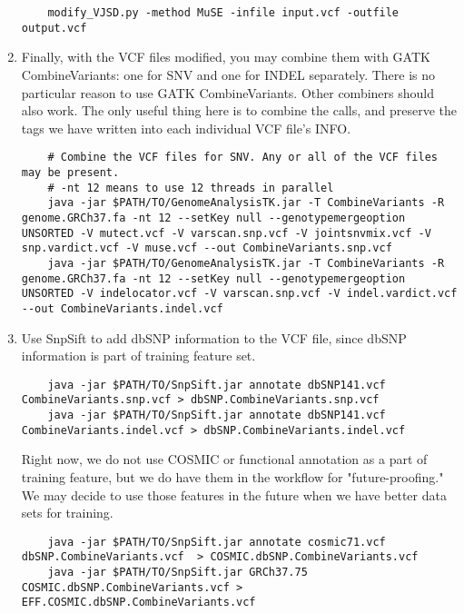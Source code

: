 \documentclass[10pt,letterpaper]{article}
\begin{document}
\begin{enumerate}
	\begin{lstlisting}
	modify_VJSD.py -method MuSE -infile input.vcf -outfile output.vcf
	\end{lstlisting}

	\item
	Finally, with the VCF files modified, you may combine them with GATK CombineVariants: one for SNV and one for INDEL separately. There is no particular reason to use GATK CombineVariants. Other combiners should also work. The only useful thing here is to combine the calls, and preserve the tags we have written into each individual VCF file's INFO. 
	
	\begin{lstlisting}
	# Combine the VCF files for SNV. Any or all of the VCF files may be present.
	# -nt 12 means to use 12 threads in parallel
	java -jar $PATH/TO/GenomeAnalysisTK.jar -T CombineVariants -R genome.GRCh37.fa -nt 12 --setKey null --genotypemergeoption UNSORTED -V mutect.vcf -V varscan.snp.vcf -V jointsnvmix.vcf -V snp.vardict.vcf -V muse.vcf --out CombineVariants.snp.vcf
	java -jar $PATH/TO/GenomeAnalysisTK.jar -T CombineVariants -R genome.GRCh37.fa -nt 12 --setKey null --genotypemergeoption UNSORTED -V indelocator.vcf -V varscan.snp.vcf -V indel.vardict.vcf --out CombineVariants.indel.vcf
	\end{lstlisting}
	
	
	\item
	Use SnpSift to add dbSNP information to the VCF file, since dbSNP information is part of training feature set.
	
	\begin{lstlisting}
	java -jar $PATH/TO/SnpSift.jar annotate dbSNP141.vcf CombineVariants.snp.vcf > dbSNP.CombineVariants.snp.vcf
	java -jar $PATH/TO/SnpSift.jar annotate dbSNP141.vcf CombineVariants.indel.vcf > dbSNP.CombineVariants.indel.vcf
	\end{lstlisting}
	
	Right now, we do not use COSMIC or functional annotation as a part of training feature, but we do have them in the workflow for "future-proofing." We may decide to use those features in the future when we have better data sets for training. 
	
	\begin{lstlisting}
	java -jar $PATH/TO/SnpSift.jar annotate cosmic71.vcf dbSNP.CombineVariants.vcf  > COSMIC.dbSNP.CombineVariants.vcf
	java -jar $PATH/TO/SnpSift.jar GRCh37.75 COSMIC.dbSNP.CombineVariants.vcf > EFF.COSMIC.dbSNP.CombineVariants.vcf
	\end{lstlisting}
	

\end{enumerate}
\end{document}
